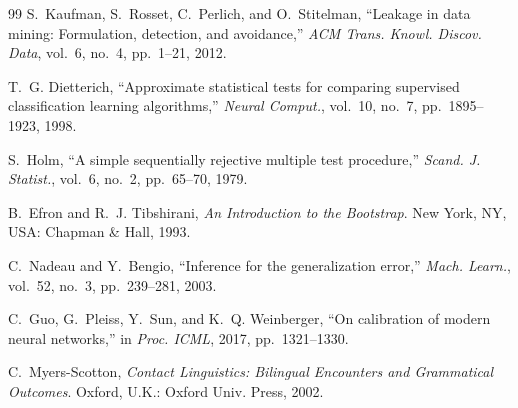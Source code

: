 \documentclass[10pt,journal]{IEEEtran}
\begin{document}
\begin{thebibliography}{99}
S.~Kaufman, S.~Rosset, C.~Perlich, and O.~Stitelman, ``Leakage in data mining: Formulation, detection, and avoidance,'' \emph{ACM Trans. Knowl. Discov. Data}, vol.~6, no.~4, pp.~1--21, 2012.

T.~G. Dietterich, ``Approximate statistical tests for comparing supervised classification learning algorithms,'' \emph{Neural Comput.}, vol.~10, no.~7, pp.~1895--1923, 1998.

S.~Holm, ``A simple sequentially rejective multiple test procedure,'' \emph{Scand. J. Statist.}, vol.~6, no.~2, pp.~65--70, 1979.

B.~Efron and R.~J. Tibshirani, \emph{An Introduction to the Bootstrap}. New York, NY, USA: Chapman \& Hall, 1993.

C.~Nadeau and Y.~Bengio, ``Inference for the generalization error,'' \emph{Mach. Learn.}, vol.~52, no.~3, pp.~239--281, 2003.

C.~Guo, G.~Pleiss, Y.~Sun, and K.~Q. Weinberger, ``On calibration of modern neural networks,'' in \emph{Proc. ICML}, 2017, pp.~1321--1330.

C.~Myers-Scotton, \emph{Contact Linguistics: Bilingual Encounters and Grammatical Outcomes}. Oxford, U.K.: Oxford Univ. Press, 2002.

\end{thebibliography}
\end{document}
